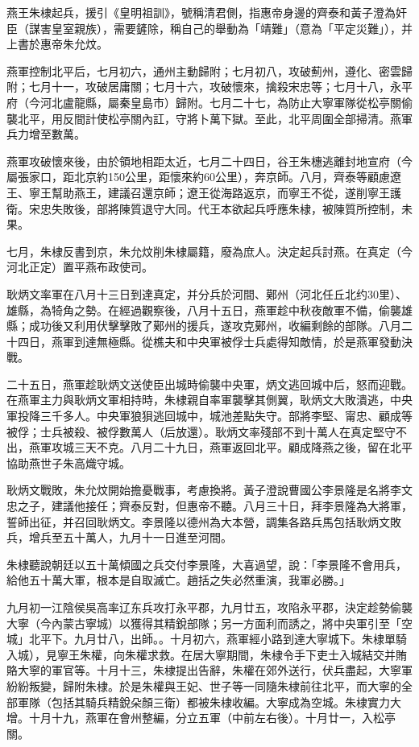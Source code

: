 燕王朱棣起兵，援引《皇明祖訓》，號稱清君側，指惠帝身邊的齊泰和黃子澄為奸臣（謀害皇室親族），需要鏟除，稱自己的舉動為「靖難」（意為「平定災難」），并上書於惠帝朱允炆。

燕軍控制北平后，七月初六，通州主動歸附；七月初八，攻破薊州，遵化、密雲歸附；七月十一，攻破居庸關；七月十六，攻破懷來，擒殺宋忠等；七月十八，永平府（今河北盧龍縣，屬秦皇島市）歸附。七月二十七，為防止大寧軍隊從松亭關偷襲北平，用反間計使松亭關內訌，守將卜萬下獄。至此，北平周圍全部掃清。燕軍兵力增至數萬。

燕軍攻破懷來後，由於領地相距太近，七月二十四日，谷王朱橞逃離封地宣府（今屬張家口，距北京約150公里，距懷來約60公里），奔京師。八月，齊泰等顧慮遼王、寧王幫助燕王，建議召還京師；遼王從海路返京，而寧王不從，遂削寧王護衛。宋忠失敗後，部將陳質退守大同。代王本欲起兵呼應朱棣，被陳質所控制，未果。

七月，朱棣反書到京，朱允炆削朱棣屬籍，廢為庶人。決定起兵討燕。在真定（今河北正定）置平燕布政使司。

耿炳文率軍在八月十三日到達真定，并分兵於河間、鄚州（河北任丘北约30里）、雄縣，為犄角之勢。在經過觀察後，八月十五日，燕軍趁中秋夜敵軍不備，偷襲雄縣；成功後又利用伏擊擊敗了鄚州的援兵，遂攻克鄚州，收編剩餘的部隊。八月二十四日，燕軍到達無極縣。從樵夫和中央軍被俘士兵處得知敵情，於是燕軍發動決戰。

二十五日，燕軍趁耿炳文送使臣出城時偷襲中央軍，炳文逃回城中后，怒而迎戰。在燕軍主力與耿炳文軍相持時，朱棣親自率軍襲擊其側翼，耿炳文大敗潰逃，中央軍投降三千多人。中央軍狼狽逃回城中，城池差點失守。部將李堅、甯忠、顧成等被俘；士兵被殺、被俘數萬人（后放還）。耿炳文率殘部不到十萬人在真定堅守不出，燕軍攻城三天不克。八月二十九日，燕軍返回北平。顧成降燕之後，留在北平協助燕世子朱高熾守城。

耿炳文戰敗，朱允炆開始擔憂戰事，考慮換將。黃子澄說曹國公李景隆是名將李文忠之子，建議他接任；齊泰反對，但惠帝不聽。八月三十日，拜李景隆為大將軍，誓師出征，并召回耿炳文。李景隆以德州為大本營，調集各路兵馬包括耿炳文敗兵，增兵至五十萬人，九月十一日進至河間。

朱棣聽說朝廷以五十萬傾國之兵交付李景隆，大喜過望，說：「李景隆不會用兵，給他五十萬大軍，根本是自取滅亡。趙括之失必然重演，我軍必勝。」

九月初一江陰侯吳高率辽东兵攻打永平郡，九月廿五，攻陷永平郡，決定趁勢偷襲大寧（今內蒙古寧城）以獲得其精銳部隊；另一方面利而誘之，將中央軍引至「空城」北平下。九月廿八，出師。。十月初六，燕軍經小路到達大寧城下。朱棣單騎入城），見寧王朱權，向朱權求救。在居大寧期間，朱棣令手下吏士入城結交并賄賂大寧的軍官等。十月十三，朱棣提出告辭，朱權在郊外送行，伏兵盡起，大寧軍紛紛叛變，歸附朱棣。於是朱權與王妃、世子等一同隨朱棣前往北平，而大寧的全部軍隊（包括其騎兵精銳朵顏三衛）都被朱棣收編。大寧成為空城。朱棣實力大增。十月十九，燕軍在會州整編，分立五軍（中前左右後）。十月廿一，入松亭關。

